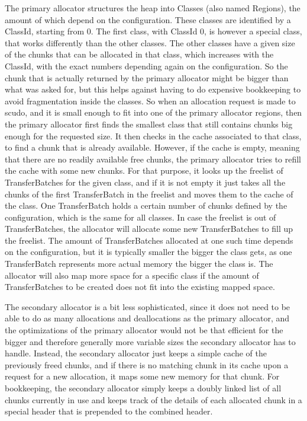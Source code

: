 \documentclass[a4paper,11pt,oneside]{report}
\begin{document}
The primary allocator structures the heap into Classes (also named Regions), the
amount of which depend on the configuration. These classes are identified by a
ClassId, starting from 0. The first class, with ClassId 0, is however a special
class, that works differently than the other classes. The other classes have a
given size of the chunks that can be allocated in that class, which increases
with the ClassId, with the exact numbers depending again on the configuration.
So the chunk that is actually returned by the primary allocator might be bigger
than what was asked for, but this helps against having to do expensive bookkeeping
to avoid fragmentation inside the classes.
So when an allocation request is made to scudo, and it is small enough to fit into
one of the primary allocator regions, then the primary allocator first finds the
smallest class that still contains chunks big enough for the requested size. It
then checks in the cache associated to that class, to find a chunk that is already
available. However, if the cache is empty, meaning that there are no readily
available free chunks, the primary allocator tries to refill the cache with some
new chunks. For that purpose, it looks up the freelist of TransferBatches for the
given class, and if it is not empty it just takes all the chunks of the first
TransferBatch in the freelist and moves them to the cache of the class. One
TransferBatch holds a certain number of chunks defined by the configuration,
which is the same for all classes.
In case the freelist is out of TransferBatches, the allocator will allocate
some new TransferBatches to fill up the freelist. The amount of TransferBatches
allocated at one such time depends on the configuration, but it is typically
smaller the bigger the class gets, as one TransferBatch represents more actual
memory the bigger the class is. The allocator will also map more space for a
specific class if the amount of TransferBatches to be created does not fit into
the existing mapped space.

The secondary allocator is a bit less sophisticated, since it does not need to
be able to do as many allocations and deallocations as the primary allocator,
and the optimizations of the primary allocator would not be that efficient for
the bigger and therefore generally more variable sizes the secondary allocator
has to handle. Instead, the secondary allocator just keeps a simple cache of
the previously freed chunks, and if there is no matching chunk in its cache
upon a request for a new allocation, it maps some new memory for that chunk.
For bookkeeping, the secondary allocator simply keeps a doubly linked list of
all chunks currently in use and keeps track of the details of each allocated
chunk in a special header that is prepended to the combined header.
\end{document}
